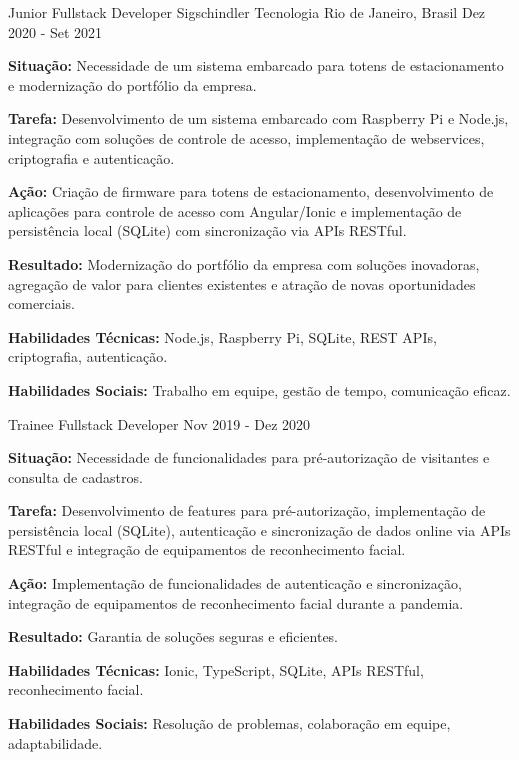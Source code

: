 \begin{cventries}
    \cventry
    {Junior Fullstack Developer} %
    {Sigschindler Tecnologia} %
    {Rio de Janeiro, Brasil} %
    {Dez 2020 - Set 2021} %
    {
      \begin{cvitems} %
        \item {\textbf{Situação:} Necessidade de um sistema embarcado para totens de estacionamento e modernização do portfólio da empresa.}
        \item {\textbf{Tarefa:} Desenvolvimento de um sistema embarcado com Raspberry Pi e Node.js, integração com soluções de controle de acesso, implementação de webservices, criptografia e autenticação.}
        \item {\textbf{Ação:} Criação de firmware para totens de estacionamento, desenvolvimento de aplicações para controle de acesso com Angular/Ionic e implementação de persistência local (SQLite) com sincronização via APIs RESTful.}
        \item {\textbf{Resultado:} Modernização do portfólio da empresa com soluções inovadoras, agregação de valor para clientes existentes e atração de novas oportunidades comerciais.}
        \item {\textbf{Habilidades Técnicas:} Node.js, Raspberry Pi, SQLite, REST APIs, criptografia, autenticação.}
        \item {\textbf{Habilidades Sociais:} Trabalho em equipe, gestão de tempo, comunicação eficaz.}
      \end{cvitems}
    }   

    
    \cventry
    {Trainee Fullstack Developer} %
    {} %
    {} %
    {Nov 2019 - Dez 2020} %
    {
      \begin{cvitems} %
        \item {\textbf{Situação:} Necessidade de funcionalidades para pré-autorização de visitantes e consulta de cadastros.}
        \item {\textbf{Tarefa:} Desenvolvimento de features para pré-autorização, implementação de persistência local (SQLite), autenticação e sincronização de dados online via APIs RESTful e integração de equipamentos de reconhecimento facial.}
        \item {\textbf{Ação:} Implementação de funcionalidades de autenticação e sincronização, integração de equipamentos de reconhecimento facial durante a pandemia.}
        \item {\textbf{Resultado:} Garantia de soluções seguras e eficientes.}
        \item {\textbf{Habilidades Técnicas:} Ionic, TypeScript, SQLite, APIs RESTful, reconhecimento facial.}
        \item {\textbf{Habilidades Sociais:} Resolução de problemas, colaboração em equipe, adaptabilidade.}
      \end{cvitems}
    }    


\end{cventries}
